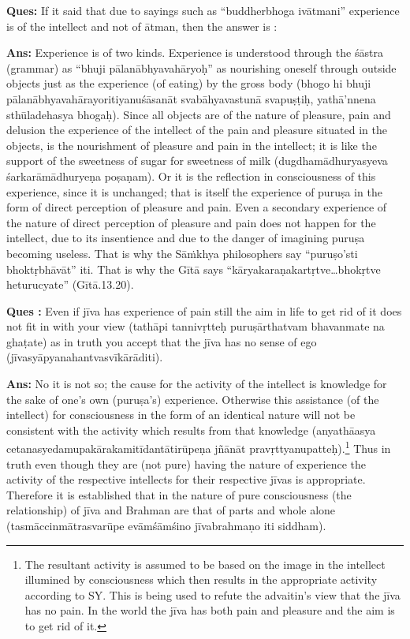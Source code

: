 \textbf{Ques:} If it said that due to sayings such as “buddherbhoga ivātmani” experience is of the intellect and not of ātman, then the answer is : 

\textbf{Ans:} Experience is of two kinds. Experience is understood through the śāstra (grammar) as “bhuji pālanābhyavahāryoḥ” as nourishing oneself through outside objects just as the experience (of eating) by the gross body (bhogo hi bhuji pālanābhyavahārayoritiyanuśāsanāt svabāhyavastunā svapuṣṭiḥ, yathā’nnena sthūladehasya bhogaḥ). Since all objects are of the nature of pleasure, pain and delusion the experience of the intellect of the pain and pleasure situated in the objects, is the nourishment of pleasure and pain in the intellect; it is like the support of the sweetness of sugar for sweetness of milk (dugdhamādhuryasyeva śarkarāmādhuryeṇa poṣaṇam). Or it is the reflection in consciousness of this experience, since it is unchanged; that is itself the experience of puruṣa in the form of direct perception of pleasure and pain. Even a secondary experience of the nature of direct perception of pleasure and pain does not happen for the intellect, due to its insentience and due to the danger of imagining puruṣa becoming useless. That is why the Sāṁkhya philosophers say “puruṣo’sti bhoktṛbhāvāt” iti. That is why the Gītā says “kāryakaraṇakartṛtve…bhokṛtve heturucyate” (Gītā.13.20).

\textbf{Ques :} Even if jīva has experience of pain still the aim in life to get rid of it does not fit in with your view (tathāpi tannivṛtteḥ puruṣārthatvam bhavanmate na ghaṭate) as in truth you accept that the jīva has no sense of ego (jīvasyāpyanahantvasvīkārāditi). 

\textbf{Ans:} No it is not so; the cause for the activity of the intellect is knowledge for the sake of one’s own (puruṣa’s) experience. Otherwise this assistance (of the intellect) for consciousness in the form of an identical nature will not be consistent with the activity which results from that knowledge (anyathāasya cetanasyedamupakārakamitīdantātirū\-peṇa jñānāt pravṛttyanupatteḥ).\footnote{The resultant activity is assumed to be based on the image in the intellect illumined by consciousness which then results in the appropriate activity according to SY. This is being used to refute the advaitin’s view that the jīva has no pain. In the world the jīva has both pain and pleasure and the aim is to get rid of it.} Thus in truth even though they are (not pure) having the nature of experience the activity of the respective intellects for their respective jīvas is appropriate. Therefore it is established that in the nature of pure consciousness (the relationship) of jīva and Brahman are that of parts and whole alone (tasmāccinmātrasvarūpe evāmśāmśino jīvabrahmaṇo iti siddham).

